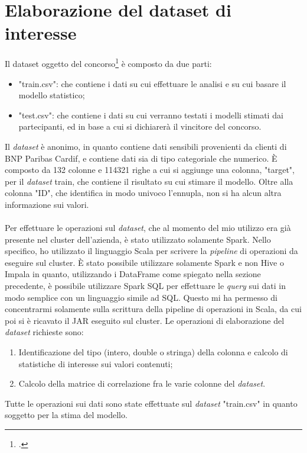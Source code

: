 \section{Elaborazione del dataset di interesse} \label{dataset}
Il dataset oggetto del concorso\footcite{https://www.kaggle.com/c/bnp-paribas-cardif-claims-management/data} è composto da due parti:
\begin{itemize}
	\item "train.csv": che contiene i dati su cui effettuare le analisi e su cui basare il modello statistico;
	\item "test.csv": che contiene i dati su cui verranno testati i modelli stimati dai partecipanti, ed in base a cui si dichiarerà il vincitore del concorso.
\end{itemize}
Il \textit{dataset} è anonimo, in quanto contiene dati sensibili provenienti da clienti di BNP Paribas Cardif, e contiene dati sia di tipo categoriale che numerico.  È composto da 132 colonne e 114321 righe a cui si aggiunge una colonna, "target", per il \textit{dataset} train, che contiene il risultato su cui stimare il modello. Oltre alla colonna "ID", che identifica in modo univoco l'ennupla, non si ha alcun altra informazione sui valori.\\\\
Per effettuare le operazioni sul \textit{dataset}, che al momento del mio utilizzo era già presente nel \gls{cluster} dell'azienda, è stato utilizzato solamente Spark. Nello specifico, ho utilizzato il linguaggio Scala per scrivere la \textit{pipeline} di operazioni da eseguire sul \gls{cluster}. È stato possibile utilizzare solamente Spark e non Hive o Impala in quanto, utilizzando i DataFrame come spiegato nella sezione precedente, è possibile utilizzare Spark SQL per effettuare le \textit{query} sui dati in modo semplice con un linguaggio simile ad SQL.
Questo mi ha permesso di concentrarmi solamente sulla scrittura della pipeline di operazioni in Scala, da cui poi si è ricavato il \gls{JAR} eseguito sul \gls{cluster}.
Le operazioni di elaborazione del \textit{dataset} richieste sono:
\begin{enumerate}
	\item Identificazione del tipo (intero, double o stringa) della colonna e calcolo di statistiche di interesse sui valori contenuti;
	\item Calcolo della matrice di correlazione fra le varie colonne del \textit{dataset}.
\end{enumerate}
Tutte le operazioni sui dati sono state effettuate sul \textit{dataset} "train.csv" in quanto soggetto per la stima del modello.

